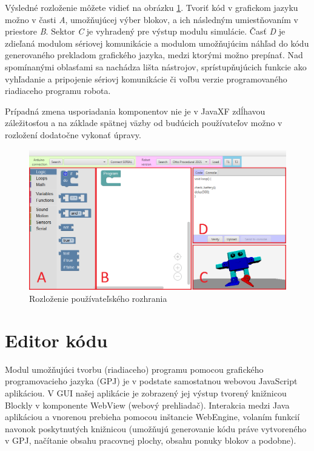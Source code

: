 Výsledné rozloženie môžete vidieť na obrázku \ref{obr:gui-layout}. Tvoriť kód v grafickom jazyku možno v časti \textit{A}, umožňujúcej výber blokov, a ich následným umiestňovaním v priestore \textit{B}. Sektor \textit{C} je vyhradený pre výstup modulu simulácie. Časť \textit{D} je zdieľaná modulom sériovej komunikácie a modulom umožňujúcim náhľad do kódu generovaného prekladom grafického jazyka, medzi ktorými možno prepínať. Nad spomínanými oblasťami sa nachádza lišta nástrojov, sprístupňujúcich funkcie ako vyhľadanie a pripojenie sériovj komunikácie či voľbu verzie programovaného riadiaceho programu robota.

Prípadná zmena usporiadania komponentov nie je v JavaXF zdĺhavou záležitosťou a na základe spätnej väzby od budúcich používateľov možno v rozložení dodatočne vykonať úpravy.

\begin{figure}
\centerline{\includegraphics[width=1\textwidth]{images/rozlozenie-gui}}
\caption[Rozloženie používateľského rozhrania]{Rozloženie používateľského rozhrania}
\label{obr:gui-layout}
\end{figure}


\section{Editor kódu}
Modul umožňujúci tvorbu (riadiaceho) programu pomocou grafického programovacieho jazyka (GPJ) je v podstate samostatnou webovou JavaScript aplikáciou. V GUI našej aplikácie je zobrazený jej výstup tvorený knižnicou Blockly v komponente WebView (webový prehliadač). Interakcia medzi  Java aplikáciou a vnorenou  prebieha pomocou inštancie WebEngine, volaním funkcií navonok poskytnutých knižnicou (umožňujú generovanie kódu práve vytvoreného v GPJ, načítanie obsahu pracovnej plochy, obsahu ponuky blokov a podobne).

